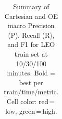 \begin{table}[t]
{\begin{tabular}{l ccc ccc ccc ccc ccc ccc}
\bottomrule
\end{tabular}%
}
\caption{Summary of Cartesian and OE macro Precision (P), Recall (R), and F1 for LEO train set at 10/30/100 minutes. Bold = best per train/time/metric. Cell color: red\,=\,low, green\,=\,high.}
\label{tab:class_leo_energy_feat}
\end{table}
